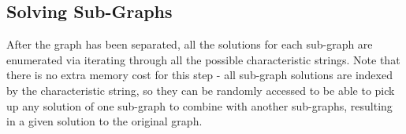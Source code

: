 \documentclass[journal]{IEEEtran}
\begin{document}
\subsection{Solving Sub-Graphs}
After the graph has been separated, all the solutions for each sub-graph are enumerated via iterating through all the possible characteristic strings. 
Note that there is no extra memory cost for this step - all sub-graph solutions are indexed by the characteristic string, so they can be randomly accessed 
to be able to pick up any solution of one sub-graph to combine with another sub-graphs, resulting in a given solution to the original graph. 

 
\end{document}
